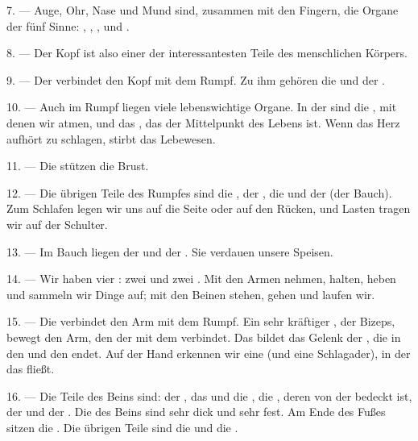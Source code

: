 7. --- Auge, Ohr, Nase und Mund sind, zusammen mit den Fingern, die Organe der
fünf Sinne: , , , 
und .

8. --- Der Kopf ist also einer der interessantesten Teile des menschlichen
Körpers.

\VUsaut{4.4mm}
\VUsaut{3.0mm}

9. --- Der  verbindet den Kopf mit dem Rumpf. Zu ihm gehören die
 und der .

10. --- Auch im Rumpf liegen viele lebenswichtige Organe. In der 
sind die , mit denen wir atmen, und das , das der
Mittelpunkt des Lebens ist. Wenn das Herz aufhört zu schlagen, stirbt das
Lebewesen.

11. --- Die  stützen die Brust.

12. --- Die übrigen Teile des Rumpfes sind die , der ,
die  und der  (der Bauch). Zum Schlafen legen
wir uns auf die Seite oder auf den Rücken, und Lasten tragen wir auf der Schulter.

13. --- Im Bauch liegen der  und der . Sie verdauen
unsere Speisen.

\VUsaut{4.4mm}
\VUsaut{3.0mm}

14. --- Wir haben vier : zwei  und zwei
. Mit den Armen nehmen, halten, heben und sammeln wir Dinge auf; mit
den Beinen stehen, gehen und laufen wir.

15. --- Die  verbindet den Arm mit dem Rumpf. Ein sehr kräftiger
, der Bizeps, bewegt den Arm, den der  mit dem
 verbindet. Das  bildet das Gelenk der
, die in den  und den  endet. Auf der
Hand erkennen wir eine  (und eine Schlagader), in der das
 fließt.

16. --- Die Teile des Beins sind: der , das  und
die , die , deren  von der
 bedeckt ist, der  und der . Die
 des Beins sind sehr dick und sehr fest. Am Ende des Fußes sitzen
die . Die übrigen Teile sind die  und die
.

